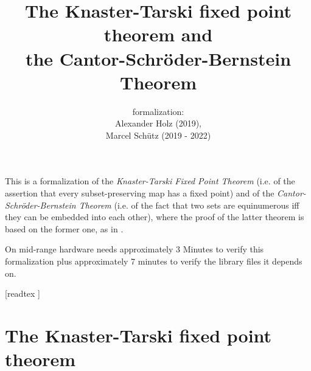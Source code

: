 \documentclass{article}
\title{The Knaster-Tarski fixed point theorem and \\
the Cantor-Schröder-Bernstein Theorem}
\author{\Naproche formalization: \vspace{0.5em} \\
Alexander Holz (2019), \\
Marcel Schütz (2019 - 2022)}
\date{}
\begin{document}
  \maketitle

  \noindent This is a formalization of the \textit{Knaster-Tarski Fixed Point
  Theorem} (i.e. of the assertion that every subset-preserving map has a fixed
  point) and of the \textit{Cantor-Schröder-Bernstein Theorem} (i.e. of the
  fact that two sets are equinumerous iff they can be embedded into each other),
  where the proof of the latter theorem is based on the former one, as in
  \cite[p. 530]{Schroeder2012}.

  On mid-range hardware \Naproche needs approximately 3 Minutes to verify this
  formalization plus approximately 7 minutes to verify the library files it
  depends on.

  \begin{forthel}

    [readtex ]

  \end{forthel}


  \section*{The Knaster-Tarski fixed point theorem}
\end{document}
